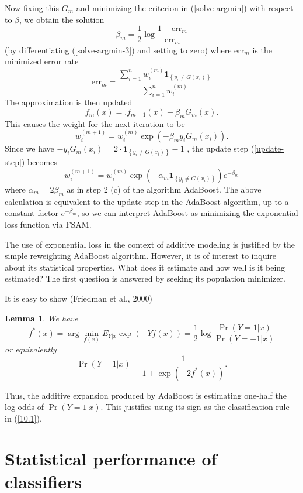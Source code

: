 \documentclass[11pt,twoside]{article}%
\theoremstyle{change}
\newtheorem{lemma}[theorem]{Lemma}
\begin{document}
Now fixing this $G_{m}$ and minimizing the criterion in (\ref{solve-argmin})
with respect to $\beta$, we obtain the solution
\[
\beta_{m}=\frac{1}{2}\log\frac{1-\mathrm{err}_{m}}{\mathrm{err}_{m}}%
\]
(by differentiating (\ref{solve-argmin-3}) and setting to zero) where
$\mathrm{err}_{m}$ is the minimized error rate%
\[
\mathrm{err}_{m}=\frac{\sum_{i=1}^{n}w_{i}^{(m)}\mathbf{1}_{\left\{  y_{i}\neq
G(x_{i})\right\}  }}{\sum_{i=1}^{n}w_{i}^{(m)}}%
\]
The approximation is then updated
\[
f_{m}(x)=.f_{m-1}(x)+\beta_{m}G_{m}(x).
\]
This causes the weight for the next iteration to be
\begin{equation}
w_{i}^{(m+1)}=w_{i}^{(m)}\exp\left(  -\beta_{m}y_{i}G_{m}(x_{i})\right)
.\label{update-step}%
\end{equation}
Since we have $-y_{i}G_{m}(x_{i})=2\cdot\mathbf{1}_{\left\{  y_{i}\neq
G(x_{i})\right\}  }-1$ , the update step (\ref{update-step}) becomes
\[
w_{i}^{(m+1)}=w_{i}^{(m)}\exp\left(  -\alpha_{m}\mathbf{1}_{\left\{  y_{i}\neq
G(x_{i})\right\}  }\right)  e^{-\beta_{m}}%
\]
where $\alpha_{m}=2\beta_{m}$ as in step 2 (c) of the algorithm AdaBoost. The
above calculation is equivalent to the update step in the AdaBoost algorithm,
up to a constant factor $e^{-\beta_{m}}$, so we can interpret AdaBoost as
minimizing the exponential loss function via FSAM.

The use of exponential loss in the context of additive modeling is justified
by the simple reweighting AdaBoost algorithm. However, it is of interest to
inquire about its statistical properties. What does it estimate and how well
is it being estimated? The first question is answered by seeking its
population minimizer.

It is easy to show (Friedman et al., 2000)

\begin{lemma}
We have
\[
f^{\ast}(x)=\arg\min_{f(x)}E_{Y|x}\exp\left(  -Yf(x)\right)  =\frac{1}{2}%
\log\frac{\Pr\left(  Y=1|x\right)  }{\Pr\left(  Y=-1|x\right)  }%
\]
\qquad or equivalently%
\[
\Pr\left(  Y=1|x\right)  =\frac{1}{1+\exp\left(  -2f^{\ast}(x)\right)  }.
\]

\end{lemma}

Thus, the additive expansion produced by AdaBoost is estimating one-half the
log-odds of $\Pr\left(  Y=1|x\right)  $. This justifies using its sign as the
classification rule in (\ref{10.1}).

\newpage

\section{Statistical performance of classifiers}
\end{document}
